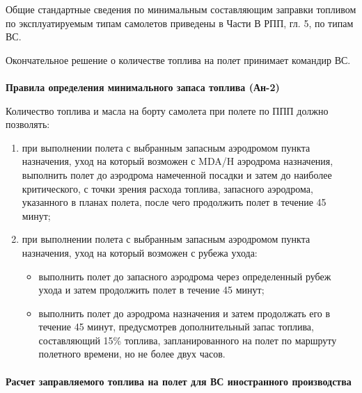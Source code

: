 Общие стандартные сведения по минимальным составляющим заправки топливом по эксплуатируемым типам самолетов приведены в Части В РПП, гл. 5, по типам ВС.

Окончательное решение о количестве топлива на полет принимает командир ВС.

\paragraph{} \textbf{Правила определения минимального запаса топлива (Ан-2)}

Количество топлива и масла на борту самолета при полете по ППП должно позволять: 
\begin{enumerate}
    \item при выполнении полета с выбранным запасным аэродромом пункта назначения, уход на который возможен с MDA/H аэродрома назначения, выполнить полет до аэродрома намеченной посадки и затем до наиболее критического, с точки зрения расхода топлива, запасного аэродрома, указанного в планах полета, после чего продолжить полет в течение 45 минут; 
    \item при выполнении полета с выбранным запасным аэродромом пункта назначения, уход на который возможен с рубежа ухода: 
    \begin{itemize}
        \item выполнить полет до запасного аэродрома через определенный рубеж ухода и затем продолжить полет в течение 45 минут;
        \item выполнить полет до аэродрома назначения и затем продолжать его в течение 45 минут, предусмотрев дополнительный запас топлива, составляющий 15\% топлива, запланированного на полет по маршруту полетного времени, но не более двух часов.
    \end{itemize}
\end{enumerate}


\paragraph{} \textbf{Расчет заправляемого топлива на полет для ВС иностранного производства}\label{par:494}


